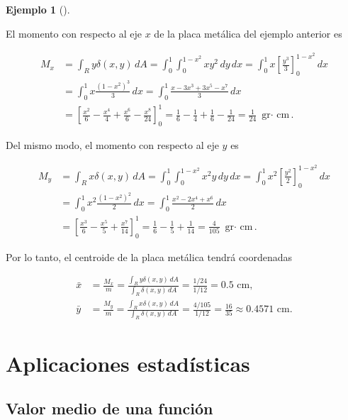 \documentclass[
  a4paper,
]{scrreport}
\theoremstyle{definition}
\theoremstyle{definition}
\newtheorem{example}{Ejemplo}[chapter]
\theoremstyle{definition}
\theoremstyle{plain}
\theoremstyle{plain}
\theoremstyle{plain}
\theoremstyle{remark}
\begin{document}
\begin{example}[]\protect\hypertarget{exm-centro-masas-solido-plano-densidad-variable}{}\label{exm-centro-masas-solido-plano-densidad-variable}

El momento con respecto al eje \(x\) de la placa metálica del ejemplo
anterior es

\begin{align*}
M_x
&= \int_R y\delta(x,y)\,dA
= \int_0^1 \int_0^{1-x^2} xy^2\,dy\,dx
= \int_0^1 x\left[\frac{y^3}{3}\right]_0^{1-x^2}\,dx \\
&= \int_0^1 x\frac{(1-x^2)^3}{3}\,dx 
= \int_0^1 \frac{x-3x^3+3x^5-x^7}{3}\,dx \\
&= \left[\frac{x^2}{6}-\frac{x^4}{4}+\frac{x^6}{6}-\frac{x^8}{24}\right]_0^1
= \frac{1}{6}-\frac{1}{4}+\frac{1}{6}-\frac{1}{24}
= \frac{1}{24} \mbox{ gr$\cdot$ cm}.
\end{align*}

Del mismo modo, el momento con respecto al eje \(y\) es

\begin{align*}
M_y
&= \int_R x\delta(x,y)\,dA
= \int_0^1 \int_0^{1-x^2} x^2y\,dy\,dx
= \int_0^1 x^2\left[\frac{y^2}{2}\right]_0^{1-x^2}\,dx \\
&= \int_0^1 x^2\frac{(1-x^2)^2}{2}\,dx 
= \int_0^1 \frac{x^2-2x^4+x^6}{2}\,dx \\
&= \left[\frac{x^3}{6}-\frac{x^5}{5}+\frac{x^7}{14}\right]_0^1
= \frac{1}{6}-\frac{1}{5}+\frac{1}{14}
= \frac{4}{105} \mbox{ gr$\cdot$ cm}.
\end{align*}

Por lo tanto, el centroide de la placa metálica tendrá coordenadas

\begin{align*}
\bar x 
&= \frac{M_x}{m}
= \frac{\int_R y\delta(x,y)\,dA}{\int_R \delta(x,y)\,dA} 
= \frac{1/24}{1/12} = 0.5 \mbox{ cm},\\
\bar y
&= \frac{M_y}{m}
= \frac{\int_R x\delta(x,y)\,dA}{\int_R \delta(x,y)\,dA}
= \frac{4/105}{1/12} = \frac{16}{35} \approx 0.4571  \mbox{ cm}.
\end{align*}

\end{example}

\section{Aplicaciones
estadísticas}\label{aplicaciones-estaduxedsticas-1}

\subsection{Valor medio de una
función}\label{valor-medio-de-una-funciuxf3n}
\end{document}
